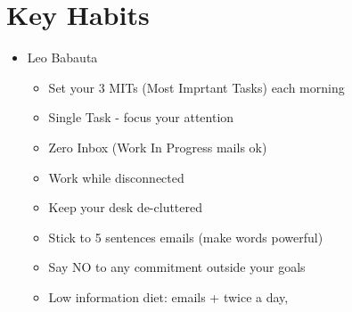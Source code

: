 \section{Key Habits}
\begin{itemize}[noitemsep,nolistsep]
\item Leo Babauta
	\begin{itemize}[noitemsep,nolistsep]
	\item Set your 3 MITs (Most Imprtant Tasks) each morning
	\item Single Task - focus your attention
	\item Zero Inbox (Work In Progress mails ok)
	\item Work while disconnected
	\item Keep your desk de-cluttered
	\item Stick to 5 sentences emails (make words powerful)
	\item Say NO to any commitment outside your goals
	\item Low information diet: emails + twice a day, 
	\end{itemize}


\end{itemize}
